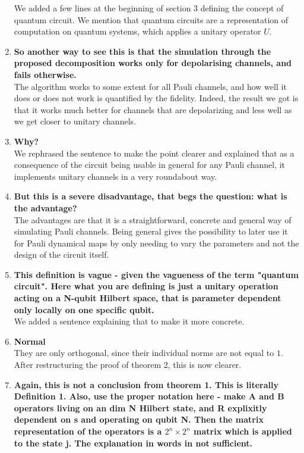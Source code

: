 \documentclass[10pt,letterpaper]{article} %
\begin{document}
\begin{enumerate}
We added a few lines at the beginning of section 3 defining the concept of quantum circuit.
We  mention that quantum circuits are a representation of computation on quantum systems, which applies a unitary operator $U$. 

\item  \textbf{So another way to see this is that the simulation through the proposed decomposition works only for depolarising channels, and fails otherwise.}\\

The algorithm works to some extent for all Pauli channels, and how well
it does or does not work is quantified by the fidelity.
Indeed, the result we got is that it works much better for channels that are depolarizing
and less well as we get closer to unitary channels.


\item \textbf{Why?}\\
We rephrased the sentence to make the point clearer
and explained that as a consequence of the circuit being usable in general for any Pauli channel,
it implements unitary channels in a very roundabout way.


\item \textbf{But this is a severe disadvantage, that begs the question: what is the advantage?} \\

The advantages are that it is a straightforward, concrete and general way
of simulating Pauli channels.
Being general gives the possibility to later use it for Pauli dynamical maps by only needing to vary the parameters
and not the design of the circuit itself.


\item \textbf{This definition is vague - given the vagueness of the term "quantum circuit".
 Here what you are defining is just a unitary operation acting on a N-qubit Hilbert space, that is parameter dependent only locally on one specific qubit. } \\
 
We added a sentence explaining that to make it more concrete.

 
\item \textbf{Normal}\\

They are only orthogonal, since their individual norms are not equal to $1$. 
After restructuring the proof of theorem 2, this is now clearer.
 
\item \textbf{Again, this is not a conclusion from theorem 1. This is literally Definition 1. Also, use the proper notation here - make A and B operators living on an dim N Hilbert state, and R explixitly dependent on s and operating on qubit N. Then the matrix representation of the operators is a $2^n\times 2^n$ matrix which is applied to the state j. The explanation in words in not sufficient.} \\


\end{enumerate}
\end{document}
